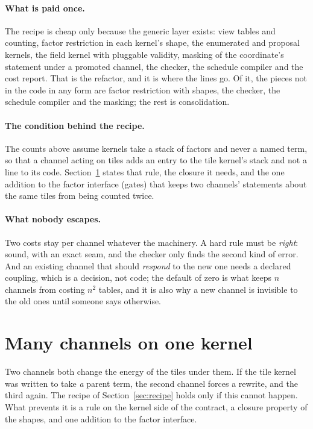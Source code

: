 \documentclass[11pt]{article}
\newcommand{\1}{\mathds{1}}
\begin{document}
\paragraph{What is paid once.} The recipe is cheap only because the generic
layer exists: view tables and counting, factor restriction in each kernel's
shape, the enumerated and proposal kernels, the field kernel with pluggable
validity, masking of the coordinate's statement under a promoted channel, the
checker, the schedule compiler and the cost report. That is the refactor, and
it is where the lines go. Of it, the pieces not in the code in any form are
factor restriction with shapes, the checker, the schedule compiler and the
masking; the rest is consolidation.

\paragraph{The condition behind the recipe.} The counts above assume kernels
take a stack of factors and never a named term, so that a channel acting on
tiles adds an entry to the tile kernel's stack and not a line to its code.
Section~\ref{sec:stacking} states that rule, the closure it needs, and the one
addition to the factor interface (gates) that keeps two channels' statements
about the same tiles from being counted twice.

\paragraph{What nobody escapes.} Two costs stay per channel whatever the
machinery. A hard rule must be \emph{right}: sound, with an exact seam, and
the checker only finds the second kind of error. And an existing channel that
should \emph{respond} to the new one needs a declared coupling, which is a
decision, not code; the default of zero is what keeps $n$ channels from
costing $n^2$ tables, and it is also why a new channel is invisible to the old
ones until someone says otherwise.

\section{Many channels on one kernel}
\label{sec:stacking}

Two channels both change the energy of the tiles under them. If the tile
kernel was written to take \emph{a} parent term, the second channel forces a
rewrite, and the third again. The recipe of Section~\ref{sec:recipe} holds only
if this cannot happen. What prevents it is a rule on the kernel side of the
contract, a closure property of the shapes, and one addition to the factor
interface.
\end{document}
